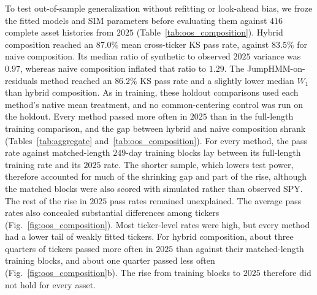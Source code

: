 To test out-of-sample generalization without refitting or look-ahead
bias, we froze the fitted models and SIM parameters before evaluating
them against $416$ complete asset histories from $2025$
(Table~\ref{tab:oos_composition}). Hybrid composition reached an
$87.0\%$ mean cross-ticker KS pass rate, against $83.5\%$ for naive
composition. Its median ratio of synthetic to observed $2025$ variance
was $0.97$, whereas naive composition inflated that ratio to $1.29$.
The JumpHMM-on-residuals method reached an $86.2\%$ KS pass rate and a slightly lower median $W_1$ than hybrid composition. As in
training, these holdout comparisons used each method's native mean
treatment, and no common-centering control was run on the holdout. Every method
passed more often in $2025$ than in the full-length training
comparison, and the gap between hybrid and naive composition shrank
(Tables~\ref{tab:aggregate} and~\ref{tab:oos_composition}). For every method, the pass rate against matched-length $249$-day
training blocks lay between its full-length training rate and its
$2025$ rate. The shorter sample, which lowers test power, therefore
accounted for much of the shrinking gap and part of the rise, although
the matched blocks were also scored with simulated rather than
observed SPY. The rest of the rise in $2025$ pass rates remained
unexplained. The average pass rates also concealed substantial
differences among tickers (Fig.~\ref{fig:oos_composition}). Most
ticker-level rates were high, but every method had a lower tail of
weakly fitted tickers. For hybrid composition, about three quarters of
tickers passed more often in $2025$ than against their matched-length
training blocks, and about one quarter passed less often
(Fig.~\ref{fig:oos_composition}b). The rise from training blocks to
$2025$ therefore did not hold for every asset.

